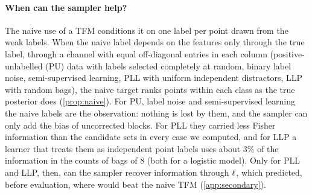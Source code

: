 \paragraph{When can the sampler help?} The naive use of a TFM conditions it on one label per point drawn from the weak
labels. When the naive label depends on the features only through the true label, through a channel with equal
off-diagonal entries in each column (positive-unlabelled (PU) data with labels selected completely at random, binary
label noise, semi-supervised learning, PLL with uniform independent distractors, LLP with random bags), the naive
target ranks points within each class as the true posterior does (\cref{prop:naive}). For PU, label noise and
semi-supervised learning the naive labels are the observation: nothing is lost by them, and the sampler can only add
the bias of uncorrected blocks. For PLL they carried less Fisher information than the candidate sets in every case we
computed, and for LLP a learner that treats them as independent point labels uses about $3\%$ of the information in
the counts of bags of 8 (both for a logistic model). Only for PLL and LLP,
then, can the sampler recover information through $\ell$, which predicted, before evaluation, where \ours{} would beat
the naive TFM 
(\cref{app:secondary}).
